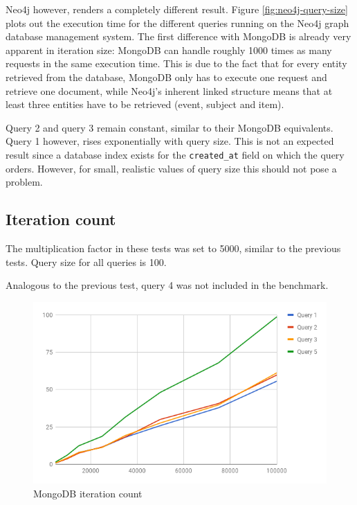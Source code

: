 Neo4j however, renders a completely different result.
Figure \ref{fig:neo4j-query-size} plots out the execution time for the different queries running on the Neo4j graph database management system.
The first difference with MongoDB is already very apparent in iteration size: MongoDB can handle roughly 1000 times as many requests in the same execution time.
This is due to the fact that for every entity retrieved from the database, MongoDB only has to execute one request and retrieve one document, while Neo4j's inherent linked structure means that at least three entities have to be retrieved (event, subject and item).

Query 2 and query 3 remain constant, similar to their MongoDB equivalents.
Query 1 however, rises exponentially with query size.
This is not an expected result since a database index exists for the \texttt{created\_at} field on which the query orders.
However, for small, realistic values of query size this should not pose a problem.

\subsection{Iteration count}
\label{subsec:iteration-size}

The multiplication factor in these tests was set to 5000, similar to the previous tests.
Query size for all queries is 100.

Analogous to the previous test, query 4 was not included in the benchmark.

\begin{figure}
  \centering
  \includegraphics[width=.8\textwidth]{img/mongodb-iteration-count.png}
  \caption{MongoDB iteration count}
  \label{fig:mongodb-iteration-count}
\end{figure}

